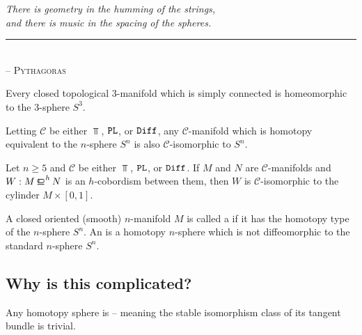 \begin{flushleft}
	\textsl{There is geometry in the humming of the strings,}\\
	\textsl{and there is music in the spacing of the spheres.}\\
	\rule[0pt]{21em}{0.5pt}\\
	-- \textsc{Pythagoras}\\
	\vspace{2em}
\end{flushleft}

\begin{conjecture}
 Every closed topological $3$-manifold which is simply connected is homeomorphic to the $3$-sphere $S^3$.
\end{conjecture}


\begin{conjecture}
  Letting $\mathscr{C}$ be either $\Top$, $\mathtt{PL}$, or $\mathtt{Diff}$, any $\mathscr{C}$-manifold which is homotopy equivalent to the $n$-sphere $S^n$ is also $\mathscr{C}$-isomorphic to $S^n$.
\end{conjecture}

\begin{theorem}[$h$-cobordism]\label{thm:h-cobordism}
  Let $n\geq 5$ and $\mathscr{C}$ be either $\Top$, $\mathtt{PL}$, or $\mathtt{Diff}$. If $M$ and $N$ are $\mathscr{C}$-manifolds and $W : M \hbord N$ is an $h$-cobordism between them, then $W$ is $\mathscr{C}$-isomorphic to the cylinder $M\times [0,1]$.
\end{theorem}



\begin{definition}
  A closed oriented (smooth) $n$-manifold $M$ is called a  if it has the homotopy type of the $n$-sphere $S^n$. An  is a homotopy $n$-sphere which is not diffeomorphic to the standard $n$-sphere $S^n$.
\end{definition}

\subsection*{Why is this complicated?}

Any homotopy sphere is  -- meaning the stable isomorphism class of its tangent bundle is trivial.

